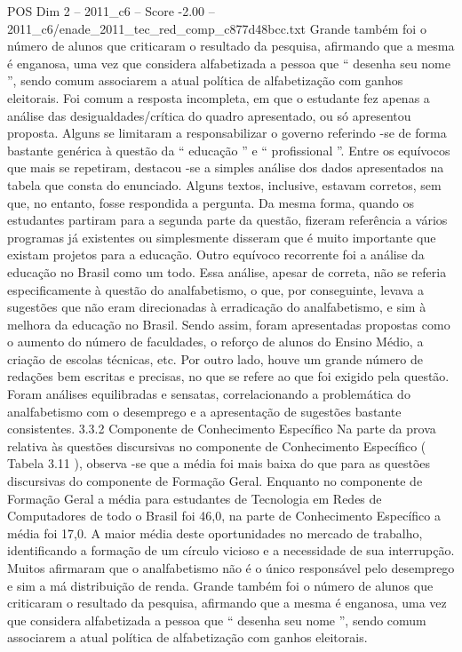 \begin{textsample}{POS Dim 2 – 2011\_c6 – Score -2.00 – 2011\_c6/enade\_2011\_tec\_red\_comp\_c877d48bcc.txt}
Grande também foi o número de alunos que criticaram o resultado da pesquisa, afirmando que a mesma é enganosa, uma vez que considera alfabetizada a pessoa que “ desenha seu nome ”, sendo comum associarem a atual política de alfabetização com ganhos eleitorais.
Foi comum a resposta incompleta, em que o estudante fez apenas a análise das desigualdades/crítica do quadro apresentado, ou só apresentou proposta.
Alguns se limitaram a responsabilizar o governo referindo -se de forma bastante genérica à questão da “ educação ” e “ profissional ”.
Entre os equívocos que mais se repetiram, destacou -se a simples análise dos dados apresentados na tabela que consta do enunciado.
Alguns textos, inclusive, estavam corretos, sem que, no entanto, fosse respondida a pergunta.
Da mesma forma, quando os estudantes partiram para a segunda parte da questão, fizeram referência a vários programas já existentes ou simplesmente disseram que é muito importante que existam projetos para a educação.
Outro equívoco recorrente foi a análise da educação no Brasil como um todo.
Essa análise, apesar de correta, não se referia especificamente à questão do analfabetismo, o que, por conseguinte, levava a sugestões que não eram direcionadas à erradicação do analfabetismo, e sim à melhora da educação no Brasil.
Sendo assim, foram apresentadas propostas como o aumento do número de faculdades, o reforço de alunos do Ensino Médio, a criação de escolas técnicas, etc.
Por outro lado, houve um grande número de redações bem escritas e precisas, no que se refere ao que foi exigido pela questão.
Foram análises equilibradas e sensatas, correlacionando a problemática do analfabetismo com o desemprego e a apresentação de sugestões bastante consistentes. 3.3.2 Componente de Conhecimento Específico Na parte da prova relativa às questões discursivas no componente de Conhecimento Específico ( Tabela 3.11 ), observa -se que a média foi mais baixa do que para as questões discursivas do componente de Formação Geral.
Enquanto no componente de Formação Geral a média para estudantes de Tecnologia em Redes de Computadores de todo o Brasil foi 46,0, na parte de Conhecimento Específico a média foi 17,0.
A maior média deste oportunidades no mercado de trabalho, identificando a formação de um círculo vicioso e a necessidade de sua interrupção.
Muitos afirmaram que o analfabetismo não é o único responsável pelo desemprego e sim a má distribuição de renda.
Grande também foi o número de alunos que criticaram o resultado da pesquisa, afirmando que a mesma é enganosa, uma vez que considera alfabetizada a pessoa que “ desenha seu nome ”, sendo comum associarem a atual política de alfabetização com ganhos eleitorais.

\end{textsample}
